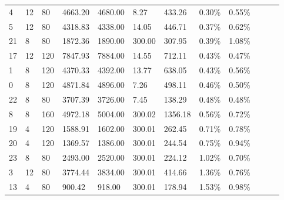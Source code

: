 \documentclass[../main]{subfiles}
\begin{document}
\begin{longtable}{l|ll|lll|lll|lll}
   4                   & 12                         & 80                         & 4663.20                   & 4680.00  & 8.27                & 433.26  & 0.30\%  & 0.55\% \\
   5                   & 12                         & 80                         & 4318.83                   & 4338.00  & 14.05               & 446.71  & 0.37\%  & 0.62\% \\
   21                  & 8                          & 80                         & 1872.36                   & 1890.00  & 300.00              & 307.95  & 0.39\%  & 1.08\% \\
   17                  & 12                         & 120                        & 7847.93                   & 7884.00  & 14.55               & 712.11  & 0.43\%  & 0.47\% \\
   1                   & 8                          & 120                        & 4370.33                   & 4392.00  & 13.77               & 638.05  & 0.43\%  & 0.56\% \\
   0                   & 8                          & 120                        & 4871.84                   & 4896.00  & 7.26                & 498.11  & 0.46\%  & 0.50\% \\
   22                  & 8                          & 80                         & 3707.39                   & 3726.00  & 7.45                & 138.29  & 0.48\%  & 0.48\% \\
   8                   & 8                          & 160                        & 4972.18                   & 5004.00  & 300.02              & 1356.18 & 0.56\%  & 0.72\% \\
   19                  & 4                          & 120                        & 1588.91                   & 1602.00  & 300.01              & 262.45  & 0.71\%  & 0.78\% \\
   20                  & 4                          & 120                        & 1369.57                   & 1386.00  & 300.01              & 244.54  & 0.75\%  & 0.94\% \\
   23                  & 8                          & 80                         & 2493.00                   & 2520.00  & 300.01              & 224.12  & 1.02\%  & 0.70\% \\
   3                   & 12                         & 80                         & 3774.44                   & 3834.00  & 300.01              & 414.66  & 1.36\%  & 0.76\% \\
   13                  & 4                          & 80                         & 900.42                    & 918.00   & 300.01              & 178.94  & 1.53\%  & 0.98\% \\

\end{longtable}
\end{document}
